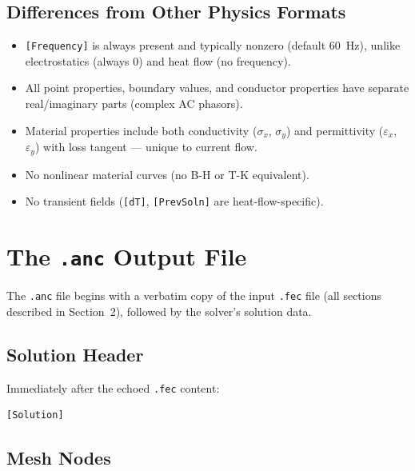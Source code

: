 \documentclass[11pt]{article}
\begin{document}
\subsection{Differences from Other Physics Formats}

\begin{itemize}
  \item \texttt{[Frequency]} is always present and typically nonzero
        (default 60~Hz), unlike electrostatics (always 0) and heat
        flow (no frequency).
  \item All point properties, boundary values, and conductor
        properties have separate real/imaginary parts (complex AC
        phasors).
  \item Material properties include both conductivity ($\sigma_x$,
        $\sigma_y$) and permittivity ($\varepsilon_x$,
        $\varepsilon_y$) with loss tangent --- unique to current flow.
  \item No nonlinear material curves (no B-H or T-K equivalent).
  \item No transient fields (\texttt{[dT]}, \texttt{[PrevSoln]} are
        heat-flow-specific).
\end{itemize}


\section{The \texttt{.anc} Output File}

The \texttt{.anc} file begins with a verbatim copy of the input
\texttt{.fec} file (all sections described in Section~2), followed by
the solver's solution data.

\subsection{Solution Header}

Immediately after the echoed \texttt{.fec} content:

\begin{lstlisting}
[Solution]
\end{lstlisting}

\subsection{Mesh Nodes}
\end{document}
